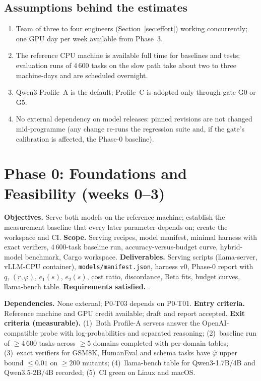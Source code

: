 \documentclass[11pt,a4paper]{article}
\begin{document}
\subsection{Assumptions behind the estimates}
\begin{enumerate}
\item Team of three to four engineers (Section~\ref{sec:effort}) working concurrently; one GPU day per week available from Phase~3.
\item The reference CPU machine is available full time for baselines and tests; evaluation runs of 4\,600 tasks on the slow path take about two to three machine-days and are scheduled overnight.
\item Qwen3 Profile~A is the default; Profile~C is adopted only through gate G0 or G5.
\item No external dependency on model releases: pinned revisions are not changed mid-programme (any change re-runs the regression suite and, if the gate's calibration is affected, the Phase-0 baseline).
\end{enumerate}

\section{Phase 0: Foundations and Feasibility (weeks 0--3)}
\textbf{Objectives.} Serve both models on the reference machine; establish the measurement baseline that every later parameter depends on; create the workspace and CI. \textbf{Scope.} Serving recipes, model manifest, minimal harness with exact verifiers, 4\,600-task baseline run, accuracy-versus-budget curve, hybrid-model benchmark, Cargo workspace. \textbf{Deliverables.} Serving scripts (llama-server, vLLM-CPU container), \texttt{models/manifest.json}, harness v0, Phase-0 report with $q$, $(r,\varphi)$, $e_1(s)$, $e_2(s)$, cost ratio, discordance, Beta fits, budget curves, llama-bench table. \textbf{Requirements satisfied.} \ReqsPhaseA.
\par\medskip\noindent\TasksPhaseA
\par\medskip\noindent\textbf{Dependencies.} None external; P0-T03 depends on P0-T01. \textbf{Entry criteria.} Reference machine and GPU credit available; draft and report accepted. \textbf{Exit criteria (measurable).} (1)~Both Profile-A servers answer the OpenAI-compatible probe with log-probabilities and separated reasoning; (2)~baseline run of $\ge4\,600$ tasks across $\ge5$ domains completed with per-domain tables; (3)~exact verifiers for GSM8K, HumanEval and schema tasks have $\hat\varphi$ upper bound $\le0.01$ on $\ge200$ mutants; (4)~llama-bench table for Qwen3-1.7B/4B and Qwen3.5-2B/4B recorded; (5)~CI green on Linux and macOS.
\end{document}
